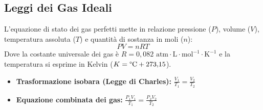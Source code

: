 \documentclass[11pt, a4paper, openright]{book}
\begin{document}
\subsection{Leggi dei Gas Ideali}
L'equazione di stato dei gas perfetti mette in relazione pressione ($P$), volume ($V$), temperatura assoluta ($T$) e quantità di sostanza in moli ($n$):
\begin{equation}
PV = nRT
\end{equation}
Dove la costante universale dei gas è $R = 0{,}082 \text{ atm}\cdot\text{L}\cdot\text{mol}^{-1}\cdot\text{K}^{-1}$ e la temperatura si esprime in Kelvin ($K = \text{\textdegree C} + 273{,}15$).
\begin{itemize}
    \item \textbf{Trasformazione isobara (Legge di Charles):} $\frac{V_1}{T_1} = \frac{V_2}{T_2}$
    \item \textbf{Equazione combinata dei gas:} $\frac{P_1 V_1}{T_1} = \frac{P_2 V_2}{T_2}$
\end{itemize}

\newpage
\end{document}
